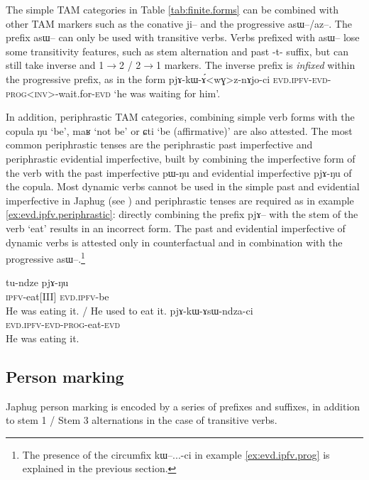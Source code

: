 \documentclass[oldfontcommands,oneside,a4paper,11pt]{article}
\newcommand{\ipa}[1]{{\phon #1}} %
\begin{document}
The simple TAM categories in Table \ref{tab:finite.forms} can be combined with other TAM markers such as the conative \ipa{ji--} and the progressive \ipa{asɯ--}/\ipa{az--}. The prefix \ipa{asɯ--} can only be used with transitive verbs. Verbs prefixed with \ipa{asɯ--} lose some transitivity features, such as stem alternation and past \ipa{-t-} suffix, but can still take inverse and 1$\rightarrow$2 / 2$\rightarrow$1 markers. The inverse prefix is \textit{infixed} within the progressive prefix, as in the form \ipa{pjɤ-kɯ-ɤ́<wɣ>z-nɤjo-ci} \textsc{evd.ipfv-evd-prog<inv>}-wait.for-\textsc{evd} `he was waiting for him'.

In addition, periphrastic TAM categories, combining simple verb forms with the copula \ipa{ŋu} `be', \ipa{maʁ} `not be' or \ipa{ɕti} `be (affirmative)' are also attested. The most common periphrastic tenses are the periphrastic past imperfective and periphrastic evidential imperfective, built by combining the imperfective form of the verb with the past imperfective \ipa{pɯ-ŋu} and evidential imperfective \ipa{pjɤ-ŋu} of the copula. Most dynamic verbs cannot be used in the simple past and evidential imperfective in Japhug (see \citealt{lin11direction}) and periphrastic tenses are required as in example \ref{ex:evd.ipfv.periphrastic}: directly combining the prefix \ipa{pjɤ--} with the stem of the verb `eat' results  in an incorrect form. The past and evidential imperfective of dynamic verbs is attested only in counterfactual and in combination with the progressive \ipa{asɯ--}.\footnote{The presence of the circumfix \ipa{kɯ--...-ci} in example \ref{ex:evd.ipfv.prog} is explained in the previous section.}

\begin{exe}
\ex \label{ex:evd.ipfv.periphrastic}
\gll
\ipa{tu-ndze} \ipa{pjɤ-ŋu} \\
 \textsc{ipfv}-eat[III] \textsc{evd.ipfv}-be \\
\glt He was eating it. / He used to eat it.
\ex \label{ex:evd.ipfv.prog}
\gll
 \ipa{pjɤ-kɯ-ɤsɯ-ndza-ci} \\
 \textsc{evd.ipfv-evd-prog}-eat-\textsc{evd} \\
\glt He was eating it.
\end{exe}



\subsection{Person marking}
Japhug person marking is encoded by a series of prefixes and suffixes, in addition to stem 1 / Stem 3 alternations in the case of transitive verbs.
\end{document}
